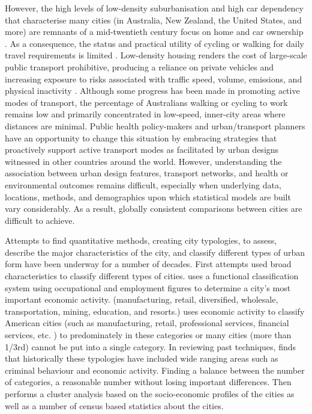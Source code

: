 \documentclass[10pt,letterpaper]{article}
\begin{document}
However, the high levels of low-density suburbanisation and high car dependency that characterise many cities (in Australia, New Zealand, the United States, and more) are remnants of a mid-twentieth century focus on home and car ownership \cite{Currie2007,Dodson2008}. As a consequence, the status and practical utility of cycling or walking for daily travel requirements is limited \cite{Heesch2014,Daley2011}. Low-density housing renders the cost of large-scale public transport prohibitive, producing a reliance on private vehicles and increasing exposure to risks associated with traffic speed, volume, emissions, and physical inactivity  \cite{Cepeda2016,MingWen2008,Norman2006}. Although some progress has been made in promoting active modes of transport, the percentage of Australians walking or cycling to work remains low and primarily concentrated in low-speed, inner-city areas where distances are minimal. Public health policy-makers and urban/transport planners have an opportunity to change this situation by embracing strategies that proactively support active transport modes as facilitated by urban designs witnessed in other countries around the world. However, understanding the association between urban design features, transport networks, and health or environmental outcomes remains difficult, especially when underlying data, locations, methods, and demographics upon which statistical models are built vary considerably. As a result, globally consistent comparisons between cities are difficult to achieve. 

Attempts to find quantitative methods, creating city typologies, to assess, describe the major characteristics of the city, and classify different types of urban form have been underway for a number of decades. First attempts used broad characteristics to classify different types of cities. \cite{Harris1943} uses a functional classification system using occupational and employment figures to determine a city's most important economic activity. (manufacturing, retail, diversified, wholesale, transportation, mining, education, and resorts.) \cite{Nelson1955} uses economic activity to classify American cities (such as manufacturing, retail, professional services, financial services, etc. ) to predominately in these categories or many cities (more than 1/3rd) cannot be put into a single category. In reviewing past techniques, \cite{Bruce1971} finds that historically these typologies have included wide ranging areas such as criminal behaviour and economic activity. Finding a balance between the number of categories, a reasonable number without losing important differences. Then \cite{Bruce1971} performs a cluster analysis based on the socio-economic profiles of the cities as well as a number of census based statistics about the cities.  
\end{document}
